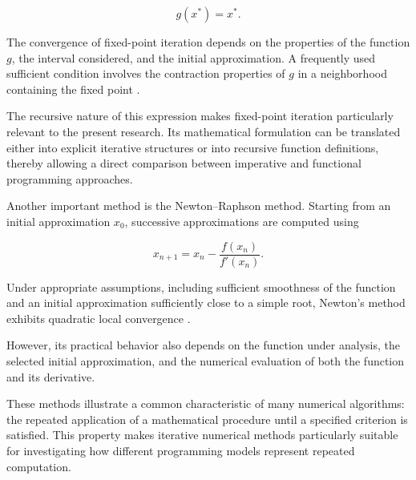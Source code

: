 \begin{equation}
    g(x^\ast) = x^\ast.
\end{equation}

The convergence of fixed-point iteration depends on the properties of the
function $g$, the interval considered, and the initial approximation. A
frequently used sufficient condition involves the contraction properties of
$g$ in a neighborhood containing the fixed point
\cite{burden2016numerical}.

The recursive nature of this expression makes fixed-point iteration
particularly relevant to the present research. Its mathematical formulation
can be translated either into explicit iterative structures or into recursive
function definitions, thereby allowing a direct comparison between imperative
and functional programming approaches.

Another important method is the Newton--Raphson method. Starting from an
initial approximation $x_0$, successive approximations are computed using

\begin{equation}
    x_{n+1}
    =
    x_n
    -
    \frac{f(x_n)}{f'(x_n)}.
\end{equation}

Under appropriate assumptions, including sufficient smoothness of the function
and an initial approximation sufficiently close to a simple root, Newton's
method exhibits quadratic local convergence
\cite{burden2016numerical,chapra2021numerical}.

However, its practical behavior also depends on the function under analysis,
the selected initial approximation, and the numerical evaluation of both the
function and its derivative.

These methods illustrate a common characteristic of many numerical algorithms:
the repeated application of a mathematical procedure until a specified
criterion is satisfied. This property makes iterative numerical methods
particularly suitable for investigating how different programming models
represent repeated computation.
